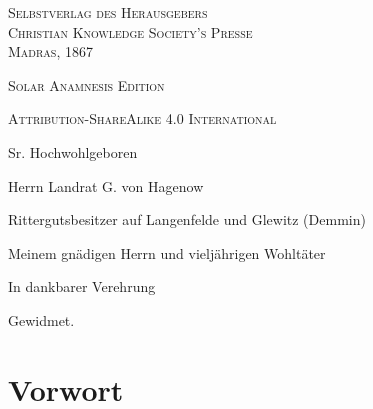\documentclass{article}
\begin{document}
\begin{titlepage}
	\vspace{1\baselineskip}

        {\scshape\small Selbstverlag des Herausgebers\\Christian Knowledge Society's Presse\\\normalsize Madras, 1867}
		
	\vspace{0.25\baselineskip} %

        {\scshape\small Solar Anamnesis Edition}%
    
	{\scshape\footnotesize Attribution-ShareAlike 4.0 International} %
\end{titlepage}
\clearpage
\tableofcontents
\clearpage
\vspace*{\fill}
\begin{center}
Sr. Hochwohlgeboren

\bigskip

Herrn Landrat G. von Hagenow

Rittergutsbesitzer auf Langenfelde und Glewitz (Demmin)

\bigskip

Meinem gnädigen Herrn und vieljährigen Wohltäter

\bigskip

In dankbarer Verehrung

\bigskip

Gewidmet.
\end{center}
\vspace*{\fill}
\clearpage
\section*{Vorwort}
\end{document}
